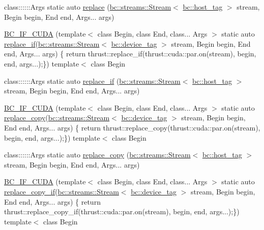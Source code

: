 \begin{DoxyCompactItemize}
\item 
class\+::::::\+Args static auto \hyperlink{namespacebc_1_1algorithms_ac61f6fc5e5556baadc24249bc26d789f}{replace} (\hyperlink{classbc_1_1streams_1_1Stream}{bc\+::streams\+::\+Stream}$<$ \hyperlink{structbc_1_1host__tag}{bc\+::host\+\_\+tag} $>$ stream, Begin begin, End end, Args... args)
\item 
\hyperlink{namespacebc_1_1algorithms_af8931991c0bc424294f11e10b21bc2c3}{B\+C\+\_\+\+I\+F\+\_\+\+C\+U\+DA} (template$<$ class Begin, class End, class... Args $>$ static auto \hyperlink{namespacebc_1_1algorithms_a82d4bf30ced3ed3664e9415fa28e7198}{replace\+\_\+if}(\hyperlink{classbc_1_1streams_1_1Stream}{bc\+::streams\+::\+Stream}$<$ \hyperlink{structbc_1_1device__tag}{bc\+::device\+\_\+tag} $>$ stream, Begin begin, End end, Args... args) \{ return thrust\+::replace\+\_\+if(thrust\+::cuda\+::par.\+on(stream), begin, end, args...);\}) template$<$ class Begin
\item 
class\+::::::\+Args static auto \hyperlink{namespacebc_1_1algorithms_a82d4bf30ced3ed3664e9415fa28e7198}{replace\+\_\+if} (\hyperlink{classbc_1_1streams_1_1Stream}{bc\+::streams\+::\+Stream}$<$ \hyperlink{structbc_1_1host__tag}{bc\+::host\+\_\+tag} $>$ stream, Begin begin, End end, Args... args)
\item 
\hyperlink{namespacebc_1_1algorithms_aa27e90d868575b1233c25545ab5ba093}{B\+C\+\_\+\+I\+F\+\_\+\+C\+U\+DA} (template$<$ class Begin, class End, class... Args $>$ static auto \hyperlink{namespacebc_1_1algorithms_ae396db51eb91930c575f9f81bc445d3c}{replace\+\_\+copy}(\hyperlink{classbc_1_1streams_1_1Stream}{bc\+::streams\+::\+Stream}$<$ \hyperlink{structbc_1_1device__tag}{bc\+::device\+\_\+tag} $>$ stream, Begin begin, End end, Args... args) \{ return thrust\+::replace\+\_\+copy(thrust\+::cuda\+::par.\+on(stream), begin, end, args...);\}) template$<$ class Begin
\item 
class\+::::::\+Args static auto \hyperlink{namespacebc_1_1algorithms_ae396db51eb91930c575f9f81bc445d3c}{replace\+\_\+copy} (\hyperlink{classbc_1_1streams_1_1Stream}{bc\+::streams\+::\+Stream}$<$ \hyperlink{structbc_1_1host__tag}{bc\+::host\+\_\+tag} $>$ stream, Begin begin, End end, Args... args)
\item 
\hyperlink{namespacebc_1_1algorithms_aadf2e327b8cb70c815253989d38f4e4f}{B\+C\+\_\+\+I\+F\+\_\+\+C\+U\+DA} (template$<$ class Begin, class End, class... Args $>$ static auto \hyperlink{namespacebc_1_1algorithms_aeff94887b8b785a757aa0c183a686d58}{replace\+\_\+copy\+\_\+if}(\hyperlink{classbc_1_1streams_1_1Stream}{bc\+::streams\+::\+Stream}$<$ \hyperlink{structbc_1_1device__tag}{bc\+::device\+\_\+tag} $>$ stream, Begin begin, End end, Args... args) \{ return thrust\+::replace\+\_\+copy\+\_\+if(thrust\+::cuda\+::par.\+on(stream), begin, end, args...);\}) template$<$ class Begin

\end{DoxyCompactItemize}
